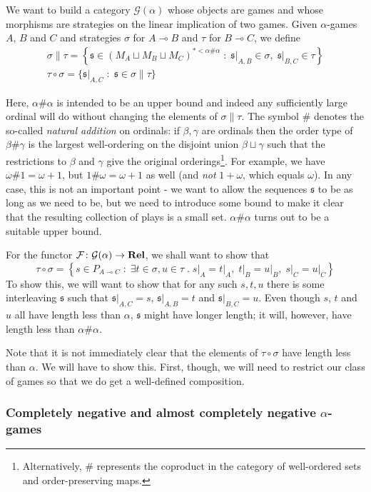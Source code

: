 \documentclass[11pt]{article} %
\theoremstyle{plain} %
\theoremstyle{definition} %
\theoremstyle{note}
\theoremstyle{exercisestyle}
\newcommand{\catname}[1]{{\normalfont\textbf{#1}}}
\newcommand{\Rel}{\catname{Rel}}
\newcommand*\from{\colon}
\newcommand{\cmap}[3]{#1\from{}#2\to{}#3}
\renewcommand{\implies}{\multimap}
\newcommand{\comp}[2]{#1 \circ #2}
\newcommand{\cprd}{\sqcup}
\newcommand{\G}{\mathcal G}
\newcommand{\suchthat}{\;\colon\;}
\newcommand{\esuchthat}{\;.\;}
\newcommand{\F}{\mathcal F}
\newcommand{\s}{\mathfrak s}
\begin{document}
We want to build a category $\G(\alpha)$ whose objects are games and whose morphisms are strategies on the linear implication of two games.  Given $\alpha$-games $A$, $B$ and $C$ and strategies $\sigma$ for $A\implies B$ and $\tau$ for $B\implies C$, we define
\begin{gather*}
  \sigma\|\tau = \left\{\s\in (M_A\cprd M_B\cprd M_C)^{*<\alpha\#\alpha}\suchthat \s\vert_{A,B}\in\sigma,\;\s\vert_{B,C}\in\tau\right\}\\
  \comp\tau\sigma = \{\s\vert_{A,C}\suchthat \s\in\sigma\|\tau\}
\end{gather*}

Here, $\alpha\#\alpha$ is intended to be an upper bound and indeed any sufficiently large ordinal will do without changing the elements of $\sigma\|\tau$.  The symbol $\#$ denotes the so-called \emph{natural addition} on ordinals: if $\beta,\gamma$ are ordinals then the order type of $\beta\#\gamma$ is the largest well-ordering on the disjoint union $\beta\sqcup\gamma$ such that the restrictions to $\beta$ and $\gamma$ give the original orderings\footnote{Alternatively, $\#$ represents the coproduct in the category of well-ordered sets and order-preserving maps.}.  For example, we have $\omega\#1=\omega+1$, but $1\#\omega=\omega+1$ as well (and \emph{not} $1+\omega$, which equals $\omega$).  In any case, this is not an important point - we want to allow the sequences $\s$ to be as long as we need to be, but we need to introduce some bound to make it clear that the resulting collection of plays is a small set.  $\alpha\#\alpha$ turns out to be a suitable upper bound.

For the functor $\cmap{\F}{\G(\alpha)}{\Rel}$, we shall want to show that
\[
  \comp\tau\sigma = \left\{s\in P_{A\implies C}\suchthat\exists t\in\sigma,u\in\tau\esuchthat s\vert_A=t\vert_A,\;t\vert_B=u\vert_B,\;s\vert_C=u\vert_C\right\}
  \]
To show this, we will want to show that for any such $s,t,u$ there is some interleaving $\s$ such that $\s\vert_{A,C}=s$, $\s\vert_{A,B}=t$ and $\s\vert_{B,C}=u$.  Even though $s$, $t$ and $u$ all have length less than $\alpha$, $\s$ might have longer length; it will, however, have length less than $\alpha\#\alpha$.

Note that it is not immediately clear that the elements of $\comp\tau\sigma$ have length less than $\alpha$.  We will have to show this.  First, though, we will need to restrict our class of games so that we do get a well-defined composition.

\subsubsection{Completely negative and almost completely negative $\alpha$-games}
\end{document}
